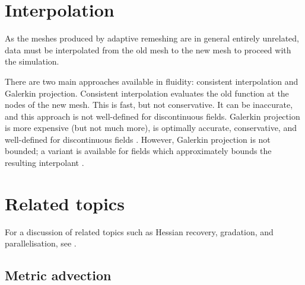\section{Interpolation} \label{sec:interpolation}
As the meshes produced by adaptive remeshing are in general entirely
unrelated, data must be interpolated from the old mesh to the new mesh
to proceed with the simulation.

There are two main approaches available in fluidity: consistent interpolation
and Galerkin projection. Consistent interpolation evaluates the old function
at the nodes of the new mesh. This is fast, but not conservative. It can be inaccurate,
and this approach is not well-defined for discontinuous fields.
Galerkin projection is more expensive (but not much more), is optimally accurate,
conservative, and well-defined for discontinuous fields \citep{farrell2009i}.
However, Galerkin projection is not bounded; a variant is available for \Pone fields
which approximately bounds the resulting interpolant \citep{farrell2009a,farrell2010a}.

\section{Related topics} \label{sec:adaptivity_related_topics}
For a discussion of related topics such as Hessian recovery, gradation, and parallelisation,
see \citep{farrell2009i}.

\subsection{Metric advection}
\label{sect:adaptivity_metric_advection}

